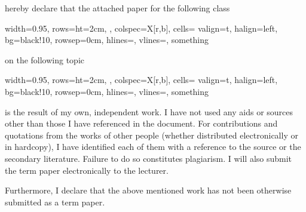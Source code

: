 \documentclass[a4paper,11pt,xcolor=dvipsnames]{article}
\begin{document}
{\vspace{0.2cm}

hereby declare that the attached paper for the following class

\vspace{-0.3cm}

\begin{center}
    \begin{tblr}{
        width=0.95\linewidth,
        rows={ht=2cm, },
        colspec={X[r,b]},
        cells= {valign=t, halign=left, bg=black!10},
        rowsep=0cm,
        hlines={},
        vlines={},
    }
    something\\
    \end{tblr}
\end{center}


\vspace{-0.1cm}

on the following topic

\vspace{-0.3cm}

\begin{center}
    \begin{tblr}{
        width=0.95\linewidth,
        rows={ht=2cm, },
        colspec={X[r,b]},
        cells= {valign=t, halign=left, bg=black!10},
        rowsep=0cm,
        hlines={},
        vlines={},
    }
    something\\
    \end{tblr}
\end{center}


\vspace{0.3cm}


is the result of my own, independent work. I have not used any aids or sources other than those I have referenced in the document. For contributions and quotations from the works of other people (whether distributed electronically or in hardcopy), I have identified each of them with a reference to the source or the secondary literature. Failure to do so constitutes plagiarism. I will also submit the term paper electronically to the lecturer.\\

\vspace{\baselineskip}

Furthermore, I declare that the above mentioned work has not been
otherwise submitted as a term paper.\\

\vspace{\baselineskip}

}
\end{document}
